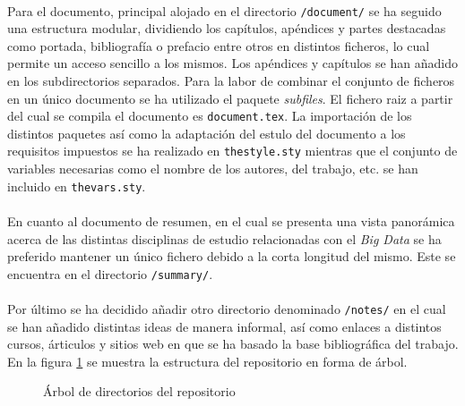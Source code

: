 \documentclass{subfiles}
\begin{document}
    \paragraph{}
    Para el documento, principal alojado en el directorio \texttt{/document/} se ha seguido una estructura modular, dividiendo los capítulos, apéndices y partes destacadas como portada, bibliografía o prefacio entre otros en distintos ficheros, lo cual permite un acceso sencillo a los mismos. Los apéndices y capítulos se han añadido en los subdirectorios separados.  Para la labor de combinar el conjunto de ficheros en un único documento se ha utilizado el paquete \emph{subfiles}. El fichero raiz a partir del cual se compila el documento es \texttt{document.tex}. La importación de los distintos paquetes así como la adaptación del estulo del documento a los requisitos impuestos se ha realizado en \texttt{thestyle.sty} mientras que el conjunto de variables necesarias como el nombre de los autores, del trabajo, etc. se han incluido en \texttt{thevars.sty}.

    \paragraph{}
    En cuanto al documento de resumen, en el cual se presenta una vista panorámica acerca de las distintas disciplinas de estudio relacionadas con el \emph{Big Data} se ha preferido mantener un único fichero debido a la corta longitud del mismo. Este se encuentra en el directorio \texttt{/summary/}.

    \paragraph{}
    Por último se ha decidido añadir otro directorio denominado \texttt{/notes/} en el cual se han añadido distintas ideas de manera informal, así como enlaces a distintos cursos, árticulos y sitios web en que se ha basado la base bibliográfica del trabajo. En la figura \ref{fig:repository-tree} se muestra la estructura del repositorio en forma de árbol.

    \begin{figure}
      \centering
      \caption{Árbol de directorios del repositorio}
      \label{fig:repository-tree}
    \end{figure}
\end{document}
